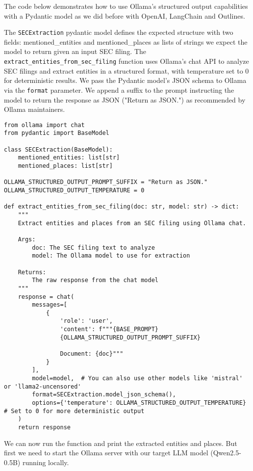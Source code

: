 The code below demonstrates how to use Ollama's structured output capabilities with a Pydantic model as we did before with OpenAI, LangChain and Outlines. 

The \texttt{SECExtraction} pydantic model defines the expected structure with two fields: mentioned\_entities and mentioned\_places as lists of strings we expect the model to return given an input SEC filing. The \texttt{extract\_entities\_from\_sec\_filing} function uses Ollama's chat API to analyze SEC filings and extract entities in a structured format, with temperature set to 0 for deterministic results. We pass the Pydantic model's JSON schema to Ollama via the \texttt{format} parameter. We append a suffix to the prompt instructing the model to return the response as JSON ("Return as JSON.") as recommended by Ollama maintainers.

\begin{verbatim}
from ollama import chat
from pydantic import BaseModel

class SECExtraction(BaseModel):
    mentioned_entities: list[str]
    mentioned_places: list[str]

OLLAMA_STRUCTURED_OUTPUT_PROMPT_SUFFIX = "Return as JSON."
OLLAMA_STRUCTURED_OUTPUT_TEMPERATURE = 0

def extract_entities_from_sec_filing(doc: str, model: str) -> dict:
    """
    Extract entities and places from an SEC filing using Ollama chat.
    
    Args:
        doc: The SEC filing text to analyze
        model: The Ollama model to use for extraction
        
    Returns:
        The raw response from the chat model
    """
    response = chat(
        messages=[
            {
                'role': 'user',
                'content': f"""{BASE_PROMPT}
                {OLLAMA_STRUCTURED_OUTPUT_PROMPT_SUFFIX}
                
                Document: {doc}"""
            }
        ],
        model=model,  # You can also use other models like 'mistral' or 'llama2-uncensored'
        format=SECExtraction.model_json_schema(),
        options={'temperature': OLLAMA_STRUCTURED_OUTPUT_TEMPERATURE}  # Set to 0 for more deterministic output
    )
    return response
\end{verbatim}

We can now run the function and print the extracted entities and places. But first we need to start the Ollama server with our target LLM model (Qwen2.5-0.5B) running locally.

